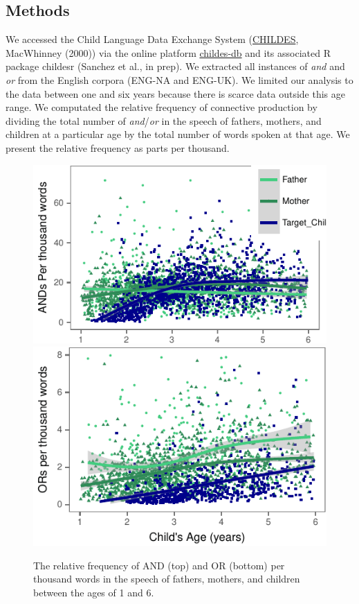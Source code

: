 \documentclass[10pt, letterpaper]{article}
\newenvironment{CodeChunk}{}{}
\begin{document}
\subsection{Methods}\label{methods}

We accessed the Child Language Data Exchange System
(\href{https://childes.talkbank.org/}{CHILDES}, MacWhinney (2000)) via
the online platform \href{http://childes-db.stanford.edu/}{childes-db}
and its associated R package childesr (Sanchez et al., in prep). We
extracted all instances of \emph{and} and \emph{or} from the English
corpora (ENG-NA and ENG-UK). We limited our analysis to the data between
one and six years because there is scarce data outside this age range.
We computated the relative frequency of connective production by
dividing the total number of \emph{and}/\emph{or} in the speech of
fathers, mothers, and children at a particular age by the total number
of words spoken at that age. We present the relative frequency as parts
per thousand.

\begin{CodeChunk}
\begin{figure}[t]
\includegraphics{figs/OverallConnectivePlots-1} \includegraphics{figs/OverallConnectivePlots-2} \caption[The relative frequency of AND (top) and OR (bottom) per thousand words in the speech of fathers, mothers, and children between the ages of 1 and 6]{The relative frequency of AND (top) and OR (bottom) per thousand words in the speech of fathers, mothers, and children between the ages of 1 and 6.}\label{fig:OverallConnectivePlots}
\end{figure}
\end{CodeChunk}
\end{document}
